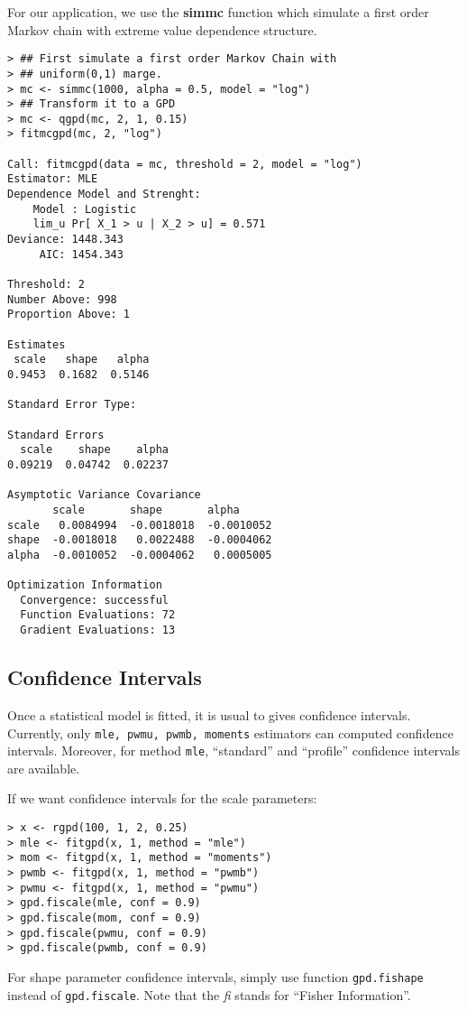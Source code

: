 \documentclass[11pt,a4paper]{article}
\numberwithin{equation}{section}
\theoremstyle{definition}
\begin{document}
For our application, we use the \textbf{simmc} function which simulate
a first order Markov chain with extreme value dependence structure.

\begin{verbatim}
> ## First simulate a first order Markov Chain with
> ## uniform(0,1) marge.
> mc <- simmc(1000, alpha = 0.5, model = "log")
> ## Transform it to a GPD
> mc <- qgpd(mc, 2, 1, 0.15)
> fitmcgpd(mc, 2, "log")

Call: fitmcgpd(data = mc, threshold = 2, model = "log") 
Estimator: MLE 
Dependence Model and Strenght:
	Model : Logistic 
	lim_u Pr[ X_1 > u | X_2 > u] = 0.571 
Deviance: 1448.343 
     AIC: 1454.343 

Threshold: 2 
Number Above: 998 
Proportion Above: 1 

Estimates
 scale   shape   alpha  
0.9453  0.1682  0.5146  

Standard Error Type: 

Standard Errors
  scale    shape    alpha  
0.09219  0.04742  0.02237  

Asymptotic Variance Covariance
       scale       shape       alpha     
scale   0.0084994  -0.0018018  -0.0010052
shape  -0.0018018   0.0022488  -0.0004062
alpha  -0.0010052  -0.0004062   0.0005005

Optimization Information
  Convergence: successful 
  Function Evaluations: 72 
  Gradient Evaluations: 13 
\end{verbatim}

\subsection{Confidence Intervals}
\label{subsec:confInt}

Once a statistical model is fitted, it is usual to gives confidence
intervals. Currently, only \verb|mle, pwmu, pwmb, moments| estimators
can computed confidence intervals. Moreover, for method \verb|mle|,
``standard'' and ``profile'' confidence intervals are available.

If we want confidence intervals for the scale parameters:
\begin{verbatim}
> x <- rgpd(100, 1, 2, 0.25)
> mle <- fitgpd(x, 1, method = "mle")
> mom <- fitgpd(x, 1, method = "moments")
> pwmb <- fitgpd(x, 1, method = "pwmb")
> pwmu <- fitgpd(x, 1, method = "pwmu")
> gpd.fiscale(mle, conf = 0.9)
> gpd.fiscale(mom, conf = 0.9)
> gpd.fiscale(pwmu, conf = 0.9)
> gpd.fiscale(pwmb, conf = 0.9)
\end{verbatim}
For shape parameter confidence intervals, simply use function
\verb|gpd.fishape| instead of \verb|gpd.fiscale|. Note that the
\emph{fi} stands for ``Fisher Information''.
\end{document}
